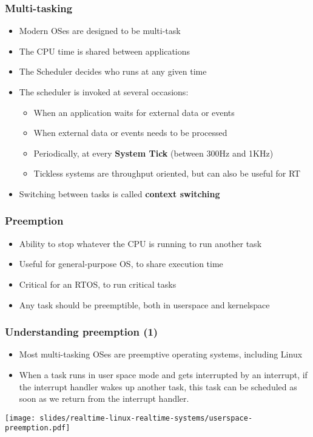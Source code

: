 \begin{frame}
  \frametitle{Multi-tasking}
        \begin{itemize}
                \item Modern OSes are designed to be multi-task
                \item The CPU time is shared between applications
                \item The Scheduler decides who runs at any given time
                \item The scheduler is invoked at several occasions:
                        \begin{itemize}
                                \item When an application waits for external data or events
                                \item When external data or events needs to be processed
                                \item Periodically, at every \textbf{System Tick} (between 300Hz and 1KHz)
                                \item Tickless systems are throughput oriented, but can also be useful for RT
                        \end{itemize}
                \item Switching between tasks is called \textbf{context switching}
        \end{itemize}
\end{frame}

\begin{frame}
        \frametitle{Preemption}
        \begin{itemize}
                \item Ability to stop whatever the CPU is running to run another task
                \item Useful for general-purpose OS, to share execution time
                \item Critical for an RTOS, to run critical tasks
                \item Any task should be preemptible, both in userspace and kernelspace
        \end{itemize}
\end{frame}

\begin{frame}
  \frametitle{Understanding preemption (1)}
  \begin{itemize}
  \item Most multi-tasking OSes are preemptive operating systems, including Linux
  \item When a task runs in user space mode and gets interrupted by an
    interrupt, if the interrupt handler wakes up another task, this
    task can be scheduled as soon as we return from the interrupt
    handler.
  \end{itemize}
  \begin{center}
    \texttt{[image: slides/realtime-linux-realtime-systems/userspace-preemption.pdf]}
  \end{center}
\end{frame}

